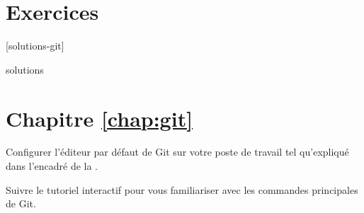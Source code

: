 \endgroup                       %


\section{Exercices}
\label{sec:git:exercices}

[solutions-git]

\begin{Filesave}{solutions}
\section*{Chapitre \ref*{chap:git}}

\end{Filesave}

\begin{exercice}[nosol]
  Configurer l'éditeur par défaut de Git sur votre poste de travail
  tel qu'expliqué dans l'encadré de la
  .
\end{exercice}


\begin{exercice}[nosol]
  Suivre le tutoriel interactif 
  pour vous familiariser avec les commandes principales de Git.
\end{exercice}

